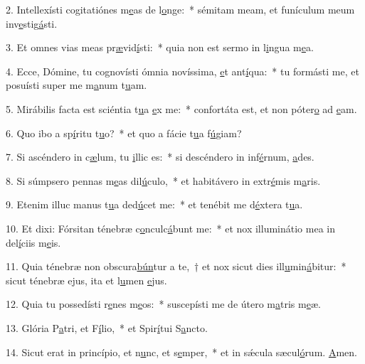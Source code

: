 2. Intellexísti cogitatiónes m\uline{e}as de l\uline{o}nge:~* sémitam meam, et funículum meum inv\uline{e}stig\uline{á}sti.\par 
3. Et omnes vias meas pr\uline{æ}vid\uline{í}sti:~* quia non est sermo in l\uline{i}ngua m\uline{e}a.\par 
4. Ecce, Dómine, tu cognovísti ómnia novíssima, \uline{e}t ant\uline{í}qua:~* tu formásti me, et posuísti super me m\uline{a}num t\uline{u}am.\par 
5. Mirábilis facta est sciéntia t\uline{u}a \uline{e}x me:~* confortáta est, et non póter\uline{o} ad \uline{e}am.\par 
6. Quo ibo a sp\uline{í}ritu t\uline{u}o?~* et quo a fácie t\uline{u}a f\uline{ú}giam?\par 
7. Si ascéndero in c\uline{æ}lum, tu \uline{i}llic es:~* si descéndero in inf\uline{é}rnum, \uline{a}des.\par 
8. Si súmpsero pennas m\uline{e}as dil\uline{ú}culo,~* et habitávero in extr\uline{é}mis m\uline{a}ris.\par 
9. Etenim illuc manus t\uline{u}a ded\uline{ú}cet me:~* et tenébit me d\uline{é}xtera t\uline{u}a.\par 
10. Et dixi: Fórsitan ténebræ c\uline{o}nculc\uline{á}bunt me:~* et nox illuminátio mea in del\uline{í}ciis m\uline{e}is.\par 
11. Quia ténebræ non obscura\uline{bún}tur a te,~† et nox sicut dies ill\uline{u}min\uline{á}bitur:~* sicut ténebræ ejus, ita et l\uline{u}men \uline{e}jus.\par 
12. Quia tu possedísti r\uline{e}nes m\uline{e}os:~* suscepísti me de útero m\uline{a}tris m\uline{e}æ.\par 
13. Glória P\uline{a}tri, et F\uline{í}lio,~* et Spir\uline{í}tui S\uline{a}ncto.\par 
14. Sicut erat in princípio, et n\uline{u}nc, et s\uline{e}mper,~* et in sǽcula sæcul\uline{ó}rum. \uline{A}men.\par 
